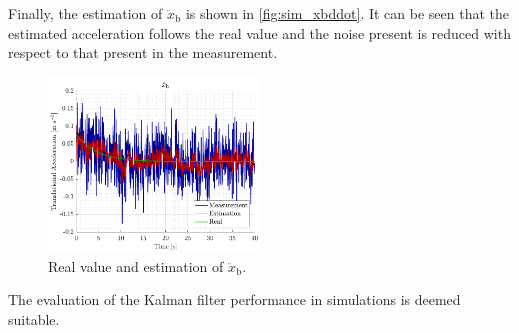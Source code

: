 Finally, the estimation of $\ddot{x}_\mathrm{b}$ is shown in \autoref{fig:sim_xbddot}. It can be seen that the estimated acceleration follows the real value and the noise present is reduced with respect to that present in the measurement.
\begin{figure}[H]
	\includegraphics[width=0.5\textwidth]{figures/sim_xbddot}
	\caption{Real value and estimation of $\ddot{x}_\mathrm{b}$.}
	\label{fig:sim_xbddot}
\end{figure}

The evaluation of the Kalman filter performance in simulations is deemed suitable. 